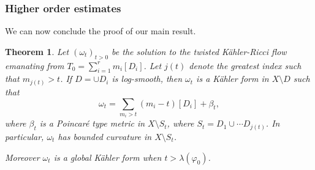 \documentclass[11pt]{amsart}
\numberwithin{equation}{section}
\newtheorem{theorem}{Theorem}[section]
\newcommand{\f}{\varphi}
\newcommand \la {\lambda}
\begin{document}
 
 
 
  \subsubsection{Higher order estimates}
  
  We can now conclude the proof of our main result.
  
  \begin{theorem} \label{thm:main}
  Let $(\omega_t)_{t>0}$ be the solution to the twisted K\"ahler-Ricci flow emanating from $T_0=\sum_{i=1}^r m_i[D_i]$.
Let $j(t)$ denote the greatest index such that $m_{j(t)}>t$.
If $D=\cup D_i$ is log-smooth, then $\omega_t$ is a K\"ahler form in $X \setminus D$ such that
   $$
   \omega_t=\sum_{m_i>t} (m_i-t)  [D_i] + 	\beta_{t},
   $$
   where $\beta_{t}$ is a  Poincar\'e type metric in $X \setminus S_t$,
   where $S_t=D_1 \cup \cdots D_{j(t)}$. In particular, $\omega_t$ has bounded curvature in $X\setminus S_t$. 
   
Moreover $\omega_t$ is a global K\"ahler form when $t > \la(\f_0)$.
  \end{theorem}
  
\end{document}
